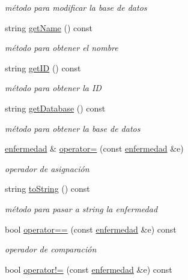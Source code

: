 \begin{DoxyCompactItemize}
\begin{DoxyCompactList}\small\item\em método para modificar la base de datos \end{DoxyCompactList}\item 
string \hyperlink{classenfermedad_ab22f6f0140a5fe5a331d72920d95f55b}{get\+Name} () const 
\begin{DoxyCompactList}\small\item\em método para obtener el nombre \end{DoxyCompactList}\item 
string \hyperlink{classenfermedad_aaf9b9135b1d4efda7dc61856fce1b7b2}{get\+ID} () const 
\begin{DoxyCompactList}\small\item\em método para obtener la ID \end{DoxyCompactList}\item 
string \hyperlink{classenfermedad_a79d304a2e39ea391917744fd4d8f168d}{get\+Database} () const 
\begin{DoxyCompactList}\small\item\em método para obtener la base de datos \end{DoxyCompactList}\item 
\hyperlink{classenfermedad}{enfermedad} \& \hyperlink{classenfermedad_a795be16b7e3e6a858211ff20a62c9d85}{operator=} (const \hyperlink{classenfermedad}{enfermedad} \&e)
\begin{DoxyCompactList}\small\item\em operador de asignación \end{DoxyCompactList}\item 
string \hyperlink{classenfermedad_a044425928b4f7fa6a398cf2486260b23}{to\+String} () const 
\begin{DoxyCompactList}\small\item\em método para pasar a string la enfermedad \end{DoxyCompactList}\item 
bool \hyperlink{classenfermedad_ac2786ad7be914729516dd15611532fbb}{operator==} (const \hyperlink{classenfermedad}{enfermedad} \&e) const 
\begin{DoxyCompactList}\small\item\em operador de comparación \end{DoxyCompactList}\item 
bool \hyperlink{classenfermedad_a85bf5cbb035fd4712ff9a72188060e5c}{operator!=} (const \hyperlink{classenfermedad}{enfermedad} \&e) const 

\end{DoxyCompactItemize}
